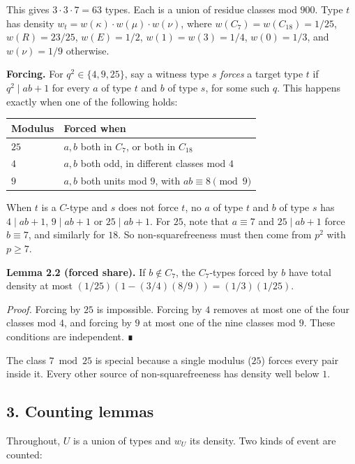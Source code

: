 \documentclass[
  11pt,
]{article}
\begin{document}
This gives \(3\cdot 3\cdot 7 = 63\) types. Each is a union of residue
classes mod \(900\). Type \(t\) has density
\(w_t = w(\kappa)\cdot w(\mu)\cdot w(\nu)\), where
\(w(C_7) = w(C_{18}) = 1/25\), \(w(R) = 23/25\), \(w(E) = 1/2\),
\(w(1) = w(3) = 1/4\), \(w(0) = 1/3\), and \(w(\nu) = 1/9\) otherwise.

\textbf{Forcing.} For \(q^2 \in \{4, 9, 25\}\), say a witness type \(s\)
\emph{forces} a target type \(t\) if \(q^2 \mid ab + 1\) for every \(a\)
of type \(t\) and \(b\) of type \(s\), for some such \(q\). This happens
exactly when one of the following holds:

\begin{longtable}[]{@{}ll@{}}
\toprule\noalign{}
Modulus & Forced when \\
\midrule\noalign{}
\endhead
\bottomrule\noalign{}
\endlastfoot
\(25\) & \(a, b\) both in \(C_7\), or both in \(C_{18}\) \\
\(4\) & \(a, b\) both odd, in different classes mod \(4\) \\
\(9\) & \(a, b\) both units mod \(9\), with \(ab \equiv 8 \pmod{9}\) \\
\end{longtable}

When \(t\) is a \(C\)-type and \(s\) does not force \(t\), no \(a\) of
type \(t\) and \(b\) of type \(s\) has \(4 \mid ab + 1\),
\(9 \mid ab + 1\) or \(25 \mid ab + 1\). For \(25\), note that
\(a \equiv 7\) and \(25 \mid ab + 1\) force \(b \equiv 7\), and
similarly for \(18\). So non-squarefreeness must then come from \(p^2\)
with \(p \ge 7\).

\textbf{Lemma 2.2 (forced share).} If \(b \notin C_7\), the
\(C_7\)-types forced by \(b\) have total density at most
\((1/25)(1 - (3/4)(8/9)) = (1/3)(1/25)\).

\emph{Proof.} Forcing by \(25\) is impossible. Forcing by \(4\) removes
at most one of the four classes mod \(4\), and forcing by \(9\) at most
one of the nine classes mod \(9\). These conditions are independent. ∎

The class \(7 \bmod 25\) is special because a single modulus (\(25\))
forces every pair inside it. Every other source of non-squarefreeness
has density well below \(1\).

\subsection{3. Counting lemmas}

Throughout, \(U\) is a union of types and \(w_U\) its density. Two kinds
of event are counted:
\end{document}
